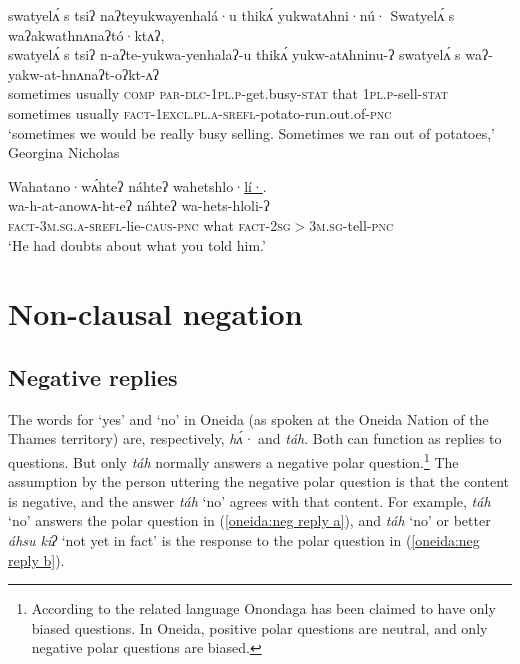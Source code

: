 \documentclass[output=paper,colorlinks,citecolor=brown]{langscibook}
\begin{document}
\ea\label{oneida:lexicalized b}
	\glll swatyelʌ́ s tsiʔ naʔteyukwayenhalá·u thikʌ́ yukwatʌhni·nú· Swatyelʌ́ s waʔakwathnʌnaʔtó·ktʌʔ, \\
	swatyelʌ́ s tsiʔ n-aʔte-yukwa-yenhala{ʔ}-u thikʌ́ yukw-atʌhninu-{ʔ} swatyelʌ́ s waʔ-yakw-at-hnʌnaʔt-oʔkt-ʌʔ \\
	sometimes usually \textsc{comp} \textsc{par-dlc-1pl.p}-get.busy-\textsc{stat} that \textsc{1pl.p}-sell-\textsc{stat} sometimes usually \textsc{fact-1excl.pl.a-srefl}-potato-run.out.of-\textsc{pnc} \\
	\glt `sometimes we would be really busy selling. Sometimes we ran out of potatoes,' Georgina Nicholas \citep[216 (141--142)]{MichelsonEtAl2016}
\z

\ea\label{oneida:lexicalized c} 
	\glll Wahatano·wʌ́hteʔ náhteʔ wahetshlo·\uline{lí·}. \\
	wa-h-at-anowʌ-ht-eʔ náhteʔ wa-hets-hloli-ʔ \\
	\textsc{fact-3m.sg.a-srefl-}lie-\textsc{caus-pnc} what \textsc{fact-2sg$>$3m.sg}-tell-\textsc{pnc}  \\
	\glt `He had doubts about what you told him.' 
\z

\section{Non-clausal negation}
\label{oneida:sec:non-clausal}

\subsection{Negative replies}
\label{oneida:sec:replies}

The words for `yes' and `no' in Oneida (as spoken at the Oneida Nation of the Thames territory) are, respectively, \textit{hʌ́·} and \textit{táh}. Both can function as replies to questions. But only \textit{táh} normally answers a negative polar question.\footnote{According to \citet[180]{SadockZwicky1985} the related language Onondaga has been claimed to have only biased questions. In Oneida, positive polar questions are neutral, and only negative polar questions are biased.} The assumption by the person uttering the negative polar question is that the content is negative, and the answer \textit{táh} `no' agrees with that content. For example, \textit{táh} `no' answers the polar question in (\ref{oneida:neg reply a}), and \textit{táh} `no' or better \textit{áhsu kiʔ} `not yet in fact' is the response to the polar question in (\ref{oneida:neg reply b}).
\end{document}
